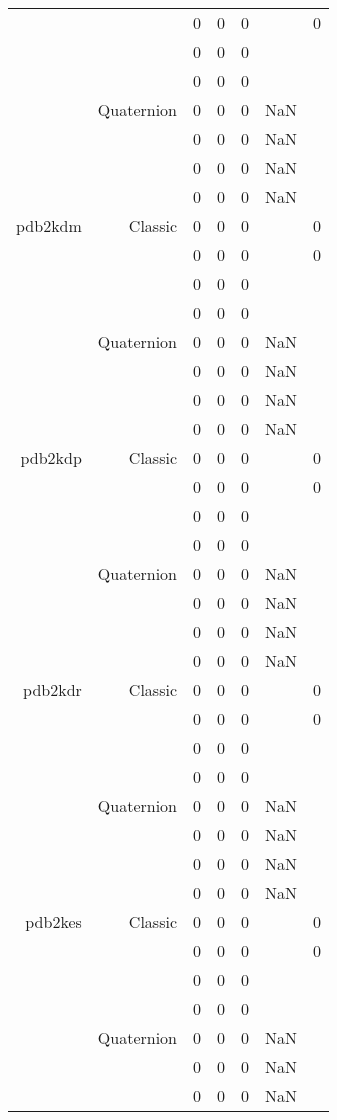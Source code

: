 \begin{xltabular}{\textwidth}{r|rcccSc}
& & 0 & 0 & 0 & & 0 \\
& & 0 & 0 & 0 & & \\
& & 0 & 0 & 0 & & \\
& Quaternion & 0 & 0 & 0 & NaN & \\
& & 0 & 0 & 0 & NaN & \\
& & 0 & 0 & 0 & NaN & \\
& & 0 & 0 & 0 & NaN & \\ \addlinespace
pdb2kdm & Classic & 0 & 0 & 0 & & 0 \\
& & 0 & 0 & 0 & & 0 \\
& & 0 & 0 & 0 & & \\
& & 0 & 0 & 0 & & \\
& Quaternion & 0 & 0 & 0 & NaN & \\
& & 0 & 0 & 0 & NaN & \\
& & 0 & 0 & 0 & NaN & \\
& & 0 & 0 & 0 & NaN & \\ \addlinespace
pdb2kdp & Classic & 0 & 0 & 0 & & 0 \\
& & 0 & 0 & 0 & & 0 \\
& & 0 & 0 & 0 & & \\
& & 0 & 0 & 0 & & \\
& Quaternion & 0 & 0 & 0 & NaN & \\
& & 0 & 0 & 0 & NaN & \\
& & 0 & 0 & 0 & NaN & \\
& & 0 & 0 & 0 & NaN & \\ \addlinespace
pdb2kdr & Classic & 0 & 0 & 0 & & 0 \\
& & 0 & 0 & 0 & & 0 \\
& & 0 & 0 & 0 & & \\
& & 0 & 0 & 0 & & \\
& Quaternion & 0 & 0 & 0 & NaN & \\
& & 0 & 0 & 0 & NaN & \\
& & 0 & 0 & 0 & NaN & \\
& & 0 & 0 & 0 & NaN & \\ \addlinespace
pdb2kes & Classic & 0 & 0 & 0 & & 0 \\
& & 0 & 0 & 0 & & 0 \\
& & 0 & 0 & 0 & & \\
& & 0 & 0 & 0 & & \\
& Quaternion & 0 & 0 & 0 & NaN & \\
& & 0 & 0 & 0 & NaN & \\
& & 0 & 0 & 0 & NaN & \\

\end{xltabular}
